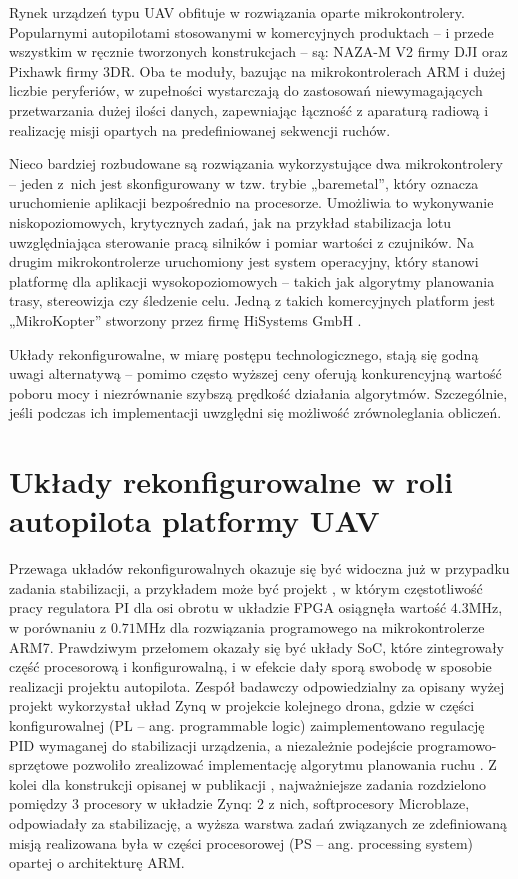 Rynek urządzeń typu UAV obfituje w rozwiązania oparte mikrokontrolery. 
Popularnymi autopilotami stosowanymi w komercyjnych produktach -- i przede wszystkim w ręcznie tworzonych konstrukcjach -- są: NAZA-M V2 firmy DJI oraz Pixhawk firmy 3DR. 
Oba te moduły, bazując na mikrokontrolerach ARM i dużej liczbie peryferiów, w zupełności wystarczają do zastosowań niewymagających przetwarzania dużej ilości danych, zapewniając łączność z aparaturą radiową i realizację misji opartych na predefiniowanej sekwencji ruchów. 

Nieco bardziej rozbudowane są rozwiązania wykorzystujące dwa mikrokontrolery -- jeden z~nich jest skonfigurowany w tzw. trybie „baremetal”, który oznacza uruchomienie aplikacji bezpośrednio na procesorze. 
Umożliwia to wykonywanie niskopoziomowych, krytycznych zadań, jak na przykład stabilizacja lotu uwzględniająca sterowanie pracą silników i pomiar wartości z czujników. 
Na drugim mikrokontrolerze uruchomiony jest system operacyjny, który stanowi platformę dla aplikacji wysokopoziomowych -- takich jak algorytmy planowania trasy, stereowizja czy śledzenie celu. 
Jedną z takich komercyjnych platform jest „MikroKopter” stworzony przez firmę HiSystems GmbH \cite{MikroKopter}.

Układy rekonfigurowalne, w miarę postępu technologicznego, stają się godną uwagi alternatywą -- pomimo często wyższej ceny oferują konkurencyjną wartość poboru mocy i niezrównanie szybszą prędkość działania algorytmów. 
Szczególnie, jeśli podczas ich implementacji uwzględni się możliwość zrównoleglania obliczeń. 

\section{Układy rekonfigurowalne w roli autopilota platformy UAV}

Przewaga układów rekonfigurowalnych okazuje się być widoczna już w przypadku zadania stabilizacji, a przykładem może być projekt \cite{Eizad}, w którym częstotliwość pracy regulatora PI dla osi obrotu w układzie FPGA osiągnęła wartość $4.3$MHz, w porównaniu z $0.71$MHz dla rozwiązania programowego na mikrokontrolerze ARM7. 
Prawdziwym przełomem okazały się być układy SoC, które zintegrowały część procesorową i konfigurowalną, i w efekcie dały sporą swobodę w sposobie realizacji projektu autopilota.
Zespół badawczy odpowiedzialny za opisany wyżej projekt wykorzystał układ Zynq w projekcie kolejnego drona, gdzie w części konfigurowalnej (PL -- ang. programmable logic) zaimplementowano regulację PID wymaganej do stabilizacji urządzenia, a niezależnie podejście programowo-sprzętowe pozwoliło zrealizować implementację algorytmu planowania ruchu \cite{Eizad2}. %
Z kolei dla konstrukcji opisanej w publikacji \cite{Schlender}, najważniejsze zadania rozdzielono pomiędzy 3 procesory w układzie Zynq: 2 z nich, softprocesory Microblaze, odpowiadały za stabilizację, a wyższa warstwa zadań związanych ze zdefiniowaną misją realizowana była w części procesorowej (PS -- ang. processing system) opartej o architekturę ARM. %

